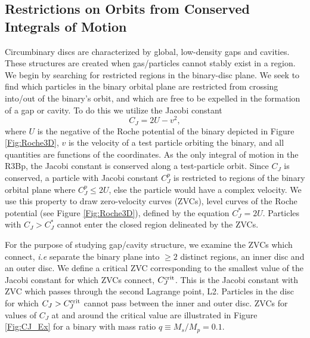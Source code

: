 \subsection{Restrictions on Orbits from Conserved Integrals of Motion}
\label{Stability Analysis}
Circumbinary discs are characterized by global, low-density 
gaps and cavities. These structures are created
when gas/particles cannot stably exist in a region. We begin by
searching for restricted regions in the binary-disc plane. We seek to
find which particles in the binary orbital plane are restricted from
crossing into/out of the binary's orbit, and which are free to be
expelled in the formation of a gap or cavity. To do this we utilize
the Jacobi constant
\begin{equation}
C_J = 2U - v^2, 
\label{Eq:CJ}
\end{equation}
where $U$ is the negative of the Roche potential of the binary depicted in
Figure \ref{Fig:Roche3D}, $v$ is the velocity of a test particle orbiting the binary, and
all quantities are functions of the coordinates. As the only integral
of motion in the R3Bp, the Jacobi constant is conserved along a
test-particle orbit. Since $C_J$ is conserved, a particle with Jacobi
constant $C^p_J$ is restricted to regions of the binary orbital plane
where $C^p_J \leq 2U$, else the particle would have a complex
velocity. We use this property to draw zero-velocity curves (ZVCs),
level curves of the Roche potential (see Figure \ref{Fig:Roche3D}), defined
by the equation $C^*_J = 2U$. Particles with $C_J > C^*_J$ cannot
enter the closed region delineated by the ZVCs.

For the purpose of studying gap/cavity structure, we examine the ZVCs
which connect, \textit{i.e} separate the binary plane into $\geq 2$
distinct regions, an inner disc and an outer disc. We define a
critical ZVC corresponding to the smallest value of the Jacobi
constant for which ZVCs connect, $C^{\rm{crit}}_J$. This is the Jacobi
constant with ZVC which passes through the second Lagrange point,
L2. Particles in the disc for which $C_J > C^{\rm{crit}}_J$ cannot
pass between the inner and outer disc.  ZVCs for values of $C_J$ at
and around the critical value are illustrated in Figure
\ref{Fig:CJ_Ex} for a binary with mass ratio $q\equiv M_s/M_p
=0.1$.



